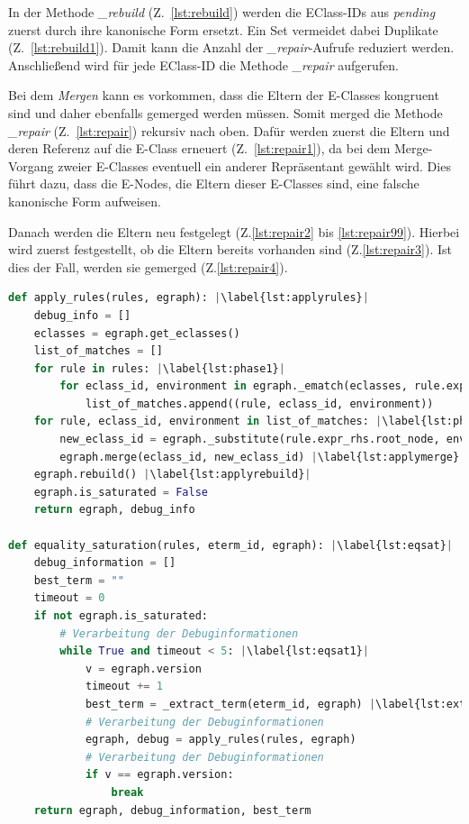 In der Methode \textit{\_rebuild} (Z.~\ref{lst:rebuild}) werden die EClass-IDs aus \textit{pending} zuerst durch ihre kanonische Form ersetzt. Ein Set vermeidet dabei Duplikate (Z.~\ref{lst:rebuild1}).  
Damit kann die Anzahl der \textit{\_repair}-Aufrufe reduziert werden.
Anschließend wird für jede EClass-ID die Methode \textit{\_repair} aufgerufen.

Bei dem \textit{Mergen} kann es vorkommen, dass die Eltern der E-Classes kongruent sind und daher ebenfalls gemerged werden müssen. Somit merged die Methode \textit{\_repair} (Z.~\ref{lst:repair}) 
rekursiv nach oben. Dafür werden zuerst die Eltern und deren Referenz auf die E-Class erneuert (Z.~\ref{lst:repair1}), da bei dem Merge-Vorgang zweier E-Classes eventuell ein anderer Repräsentant
gewählt wird. Dies führt dazu, dass die E-Nodes, die Eltern dieser E-Classes sind, eine falsche kanonische Form aufweisen.

Danach werden die Eltern neu festgelegt (Z.\ref{lst:repair2} bis \ref{lst:repair99}). Hierbei wird zuerst festgestellt, ob die Eltern bereits vorhanden sind (Z.\ref{lst:repair3}). Ist dies der Fall, werden sie
gemerged (Z.\ref{lst:repair4}).

\begin{lstlisting}[language=Python, escapechar=|, caption=Auszug aus der Klasse \textit{EGraph}, label={lst:methods3}]
def apply_rules(rules, egraph): |\label{lst:applyrules}|
    debug_info = []
    eclasses = egraph.get_eclasses()
    list_of_matches = []
    for rule in rules: |\label{lst:phase1}|
        for eclass_id, environment in egraph._ematch(eclasses, rule.expr_lhs.root_node):
            list_of_matches.append((rule, eclass_id, environment))
    for rule, eclass_id, environment in list_of_matches: |\label{lst:phase2}|
        new_eclass_id = egraph._substitute(rule.expr_rhs.root_node, environment)
        egraph.merge(eclass_id, new_eclass_id) |\label{lst:applymerge}|
    egraph.rebuild() |\label{lst:applyrebuild}|
    egraph.is_saturated = False
    return egraph, debug_info

def equality_saturation(rules, eterm_id, egraph): |\label{lst:eqsat}|
    debug_information = []
    best_term = ""
    timeout = 0
    if not egraph.is_saturated:
        # Verarbeitung der Debuginformationen
        while True and timeout < 5: |\label{lst:eqsat1}|
            v = egraph.version
            timeout += 1
            best_term = _extract_term(eterm_id, egraph) |\label{lst:extract}|
            # Verarbeitung der Debuginformationen
            egraph, debug = apply_rules(rules, egraph)
            # Verarbeitung der Debuginformationen
            if v == egraph.version:
                break
    return egraph, debug_information, best_term
\end{lstlisting} 

